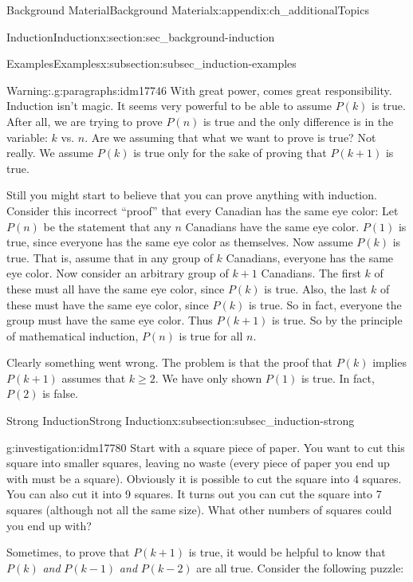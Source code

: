 \documentclass[oneside,10pt,]{book}
\numberwithin{equation}{chapter}
\begin{document}
\begin{appendixptx}{Background Material}{}{Background Material}{}{}{x:appendix:ch_additionalTopics}
\begin{sectionptx}{Induction}{}{Induction}{}{}{x:section:sec_background-induction}
\begin{subsectionptx}{Examples}{}{Examples}{}{}{x:subsection:subsec_induction-examples}
\begin{paragraphs}{Warning:.}{g:paragraphs:idm17746}
With great power, comes great responsibility. Induction isn't magic. It seems very powerful to be able to assume \(P(k)\) is true. After all, we are trying to prove \(P(n)\) is true and the only difference is in the variable: \(k\) vs. \(n\). Are we assuming that what we want to prove is true? Not really. We assume \(P(k)\) is true only for the sake of proving that \(P(k+1)\) is true.%
\par
Still you might start to believe that you can prove anything with induction. Consider this incorrect ``proof'' that every Canadian has the same eye color: Let \(P(n)\) be the statement that any \(n\) Canadians have the same eye color. \(P(1)\) is true, since everyone has the same eye color as themselves. Now assume \(P(k)\) is true. That is, assume that in any group of \(k\) Canadians, everyone has the same eye color. Now consider an arbitrary group of \(k+1\) Canadians. The first \(k\) of these must all have the same eye color, since \(P(k)\) is true. Also, the last \(k\) of these must have the same eye color, since \(P(k)\) is true. So in fact, everyone the group must have the same eye color. Thus \(P(k+1)\) is true. So by the principle of mathematical induction, \(P(n)\) is true for all \(n\).%
\par
Clearly something went wrong. The problem is that the proof that \(P(k)\) implies \(P(k+1)\) assumes that \(k \ge 2\). We have only shown \(P(1)\) is true. In fact, \(P(2)\) is false.%
\end{paragraphs}%
\end{subsectionptx}
%
%
\typeout{************************************************}
\typeout{************************************************}
%
\begin{subsectionptx}{Strong Induction}{}{Strong Induction}{}{}{x:subsection:subsec_induction-strong}
\begin{investigation}{}{g:investigation:idm17780}%
Start with a square piece of paper. You want to cut this square into smaller squares, leaving no waste (every piece of paper you end up with must be a square). Obviously it is possible to cut the square into 4 squares. You can also cut it into 9 squares. It turns out you can cut the square into 7 squares (although not all the same size). What other numbers of squares could you end up with?%
\end{investigation}
Sometimes, to prove that \(P(k+1)\) is true, it would be helpful to know that \(P(k)\) \emph{and} \(P(k-1)\) \emph{and} \(P(k-2)\) are all true. Consider the following puzzle:%

\end{subsectionptx}
\end{sectionptx}
\end{appendixptx}
\end{document}
